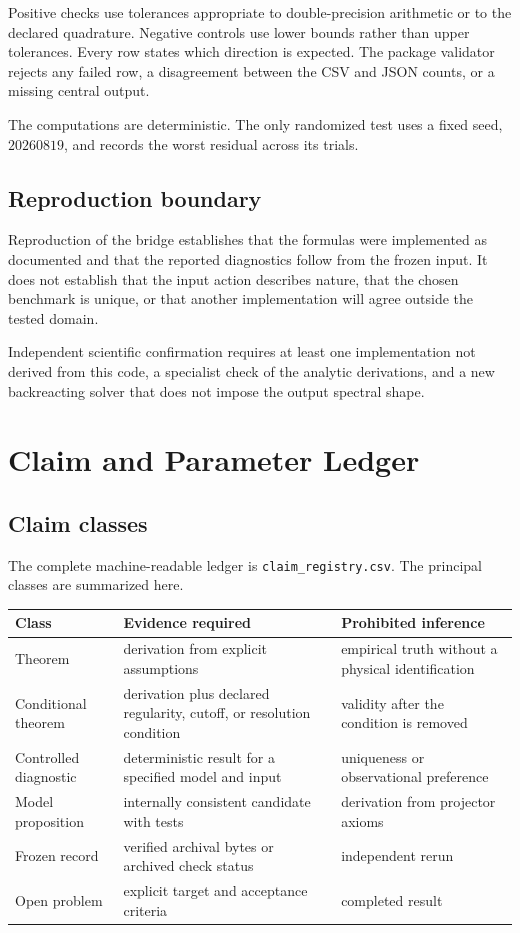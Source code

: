 Positive checks use tolerances appropriate to double-precision arithmetic or to the declared quadrature.  Negative controls use lower bounds rather than upper tolerances.  Every row states which direction is expected.  The package validator rejects any failed row, a disagreement between the CSV and JSON counts, or a missing central output.

The computations are deterministic.  The only randomized test uses a fixed seed, \(20260819\), and records the worst residual across its trials.

\section{Reproduction boundary}

Reproduction of the bridge establishes that the formulas were implemented as documented and that the reported diagnostics follow from the frozen input.  It does not establish that the input action describes nature, that the chosen benchmark is unique, or that another implementation will agree outside the tested domain.

Independent scientific confirmation requires at least one implementation not derived from this code, a specialist check of the analytic derivations, and a new backreacting solver that does not impose the output spectral shape.

\chapter{Claim and Parameter Ledger}
\label{app:ledgers}

\section{Claim classes}

The complete machine-readable ledger is \texttt{claim\_registry.csv}.  The principal classes are summarized here.

\begin{longtable}{@{}P{0.18\textwidth}P{0.34\textwidth}P{0.38\textwidth}@{}}
\toprule
Class & Evidence required & Prohibited inference\\
\midrule
Theorem & derivation from explicit assumptions & empirical truth without a physical identification\\
Conditional theorem & derivation plus declared regularity, cutoff, or resolution condition & validity after the condition is removed\\
Controlled diagnostic & deterministic result for a specified model and input & uniqueness or observational preference\\
Model proposition & internally consistent candidate with tests & derivation from projector axioms\\
Frozen record & verified archival bytes or archived check status & independent rerun\\
Open problem & explicit target and acceptance criteria & completed result\\
\bottomrule
\end{longtable}

